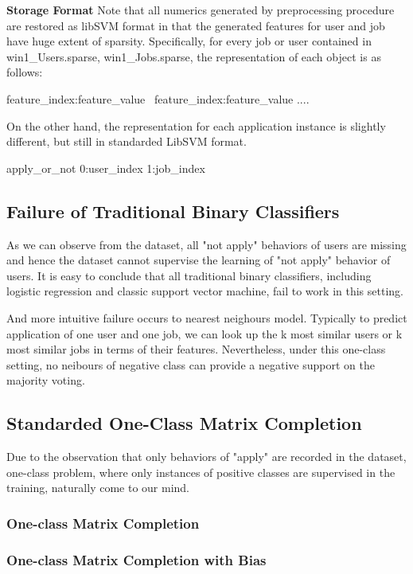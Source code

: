 \documentclass{article} %
\begin{document}
{\bf Storage Format} Note that all numerics generated by preprocessing procedure are restored as libSVM
format in that the generated features for user and job have huge extent of sparsity. 
Specifically, for every job or user contained in win1\_Users.sparse,
win1\_Jobs.sparse, the representation of each object is as follows:
\begin{center}
    feature\_index:feature\_value \ feature\_index:feature\_value .... 
\end{center}
On the other hand, the representation for each application instance is slightly different,
but still in standarded LibSVM format. 
\begin{center}
    apply\_or\_not 0:user\_index 1:job\_index
\end{center}

\subsection{Failure of Traditional Binary Classifiers} %
As we can observe from the dataset, all "not apply" behaviors of users are
missing and hence the dataset cannot supervise the learning of "not apply"
behavior of users. It is easy to conclude that all traditional binary
classifiers, including logistic regression and classic support vector machine,
fail to work in this setting.

And more intuitive failure occurs to nearest neighours model. Typically to
predict application of one user and one job, we can look up the k most similar
users or k most similar jobs in terms of their features. Nevertheless, under
this one-class setting, no neibours of negative class can provide a negative
support on the majority voting.

\subsection{Standarded One-Class Matrix Completion}
Due to the observation that only behaviors of "apply" are recorded in the
dataset, one-class problem, where only instances of positive classes are
supervised in the training, naturally come to our mind.

\subsubsection{One-class Matrix Completion} %

\subsubsection{One-class Matrix Completion with Bias} %
\end{document}

